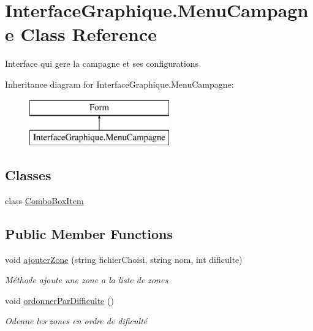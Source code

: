 \hypertarget{class_interface_graphique_1_1_menu_campagne}{\section{Interface\-Graphique.\-Menu\-Campagne Class Reference}
\label{class_interface_graphique_1_1_menu_campagne}
}


Interface qui gere la campagne et ses configurations  


Inheritance diagram for Interface\-Graphique.\-Menu\-Campagne\-:\begin{figure}[H]
\begin{center}
\leavevmode
\includegraphics[height=2.000000cm]{class_interface_graphique_1_1_menu_campagne}
\end{center}
\end{figure}
\subsection*{Classes}
\begin{DoxyCompactItemize}
\item 
class \hyperlink{class_interface_graphique_1_1_menu_campagne_1_1_combo_box_item}{Combo\-Box\-Item}
\end{DoxyCompactItemize}
\subsection*{Public Member Functions}
\begin{DoxyCompactItemize}
\item 
void \hyperlink{class_interface_graphique_1_1_menu_campagne_a91033d05622385a20396946033c442a1}{ajouter\-Zone} (string fichier\-Choisi, string nom, int dificulte)
\begin{DoxyCompactList}\small\item\em Méthode ajoute une zone a la liste de zones \end{DoxyCompactList}\item 
void \hyperlink{class_interface_graphique_1_1_menu_campagne_a1ee6e09973646ffb8022ff1df74db94f}{ordonner\-Par\-Difficulte} ()
\begin{DoxyCompactList}\small\item\em Odenne les zones en ordre de dificulté \end{DoxyCompactList}\end{DoxyCompactItemize}
